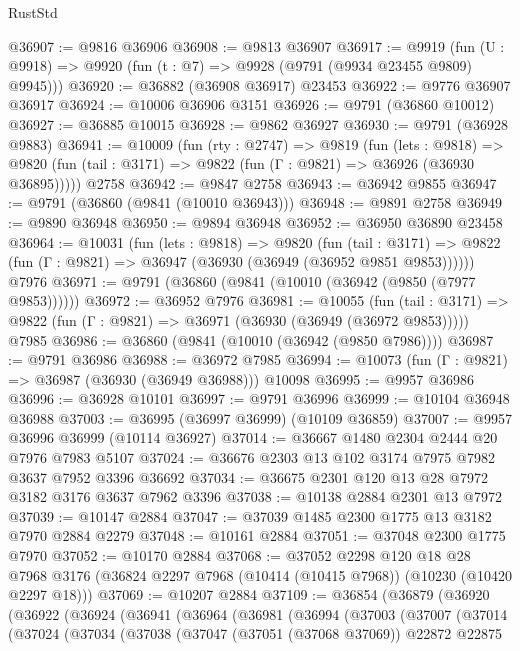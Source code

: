 \begin{lexlean}{RustStd}
\begin{coremodule}
@36907 := @9816 @36906
@36908 := @9813 @36907
@36917 := @9919
    (fun (U : @9918) => @9920 (fun (t : @7) => @9928 (@9791 (@9934 @23455 @9809) @9945)))
@36920 := @36882 (@36908 @36917) @23453
@36922 := @9776 @36907 @36917
@36924 := @10006 @36906 @3151
@36926 := @9791 (@36860 @10012)
@36927 := @36885 @10015
@36928 := @9862 @36927
@36930 := @9791 (@36928 @9883)
@36941 := @10009
    (fun (rty : @2747) =>
    @9819
      (fun (lets : @9818) =>
      @9820 (fun (tail : @3171) => @9822 (fun (Γ : @9821) => @36926 (@36930 @36895)))))
    @2758
@36942 := @9847 @2758
@36943 := @36942 @9855
@36947 := @9791 (@36860 (@9841 (@10010 @36943)))
@36948 := @9891 @2758
@36949 := @9890 @36948
@36950 := @9894 @36948
@36952 := @36950 @36890 @23458
@36964 := @10031
    (fun (lets : @9818) =>
    @9820
      (fun (tail : @3171) =>
      @9822 (fun (Γ : @9821) => @36947 (@36930 (@36949 (@36952 @9851 @9853))))))
    @7976
@36971 := @9791 (@36860 (@9841 (@10010 (@36942 (@9850 (@7977 @9853))))))
@36972 := @36952 @7976
@36981 := @10055
    (fun (tail : @3171) => @9822 (fun (Γ : @9821) => @36971 (@36930 (@36949 (@36972 @9853)))))
    @7985
@36986 := @36860 (@9841 (@10010 (@36942 (@9850 @7986))))
@36987 := @9791 @36986
@36988 := @36972 @7985
@36994 := @10073 (fun (Γ : @9821) => @36987 (@36930 (@36949 @36988))) @10098
@36995 := @9957 @36986
@36996 := @36928 @10101
@36997 := @9791 @36996
@36999 := @10104 @36948 @36988
@37003 := @36995 (@36997 @36999) (@10109 @36859)
@37007 := @9957 @36996 @36999 (@10114 @36927)
@37014 := @36667 @1480 @2304 @2444 @20 @7976 @7983 @5107
@37024 := @36676 @2303 @13 @102 @3174 @7975 @7982 @3637 @7952 @3396 @36692
@37034 := @36675 @2301 @120 @13 @28 @7972 @3182 @3176 @3637 @7962 @3396
@37038 := @10138 @2884 @2301 @13 @7972
@37039 := @10147 @2884
@37047 := @37039 @1485 @2300 @1775 @13 @3182 @7970 @2884 @2279
@37048 := @10161 @2884
@37051 := @37048 @2300 @1775 @7970
@37052 := @10170 @2884
@37068 := @37052
    @2298
    @120
    @18
    @28
    @7968
    @3176
    (@36824 @2297 @7968 (@10414 (@10415 @7968)) (@10230 (@10420 @2297 @18)))
@37069 := @10207 @2884
@37109 := @36854
    (@36879
      (@36920
        (@36922
          (@36924
            (@36941
              (@36964
                (@36981
                  (@36994
                    (@37003
                      (@37007
                        (@37014
                          (@37024
                            (@37034
                              (@37038
                                (@37047
                                  (@37051 (@37068 @37069))
                                  @22872
                                  @22875

\end{coremodule}
\end{lexlean}
